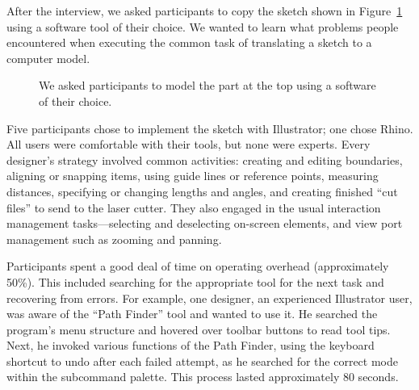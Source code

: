 After the interview, we asked participants to copy the sketch shown in
Figure~\ref{fig:interview-sketch} using a software tool of their
choice. We wanted to learn what problems people encountered when
executing the common task of translating a sketch to a computer model.

\begin{figure}[h]
\centering {}

\caption{We asked participants to model the part at the top using
  a software of their choice.}
\label{fig:interview-sketch}
\end{figure}

Five participants chose to implement the sketch with Illustrator; one
chose Rhino. All users were comfortable with their tools, but none
were experts. Every designer's strategy involved common activities:
creating and editing boundaries, aligning or snapping items, using
guide lines or reference points, measuring distances, specifying or
changing lengths and angles, and creating finished ``cut files'' to
send to the laser cutter.  They also engaged in the usual interaction
management tasks---selecting and deselecting on-screen elements, and
view port management such as zooming and panning.

Participants spent a good deal of time on operating overhead
(approximately 50\%). This included searching for the appropriate tool
for the next task and recovering from errors. For example, one
designer, an experienced Illustrator user, was aware of the ``Path
Finder'' tool and wanted to use it. He searched the program's menu
structure and hovered over toolbar buttons to read tool tips. Next, he
invoked various functions of the Path Finder, using the keyboard
shortcut to undo after each failed attempt, as he searched for the
correct mode within the subcommand palette. This process lasted
approximately 80 seconds.

